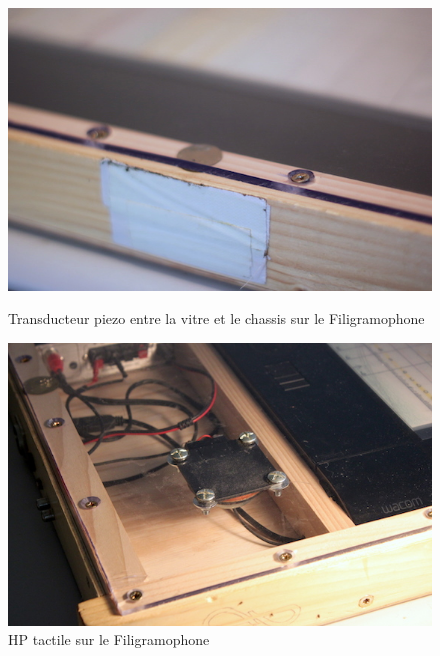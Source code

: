 \begin{figure}[!htbp]
	\captionsetup{format=plain}%
	\centering
	\begin{minipage}[t]{0.48\textwidth}
		\includegraphics[width=\linewidth]{gfx/05_interfaces/filigramophone-piezo_72dpi.jpg}
		\caption{Transducteur piezo entre la vitre et le chassis sur le Filigramophone}
		\label{fig:interface:filigramophone-piezo}
	\end{minipage}
	\hspace{.02\linewidth}
	\begin{minipage}[t]{0.48\textwidth}
		\includegraphics[width=\linewidth]{gfx/05_interfaces/filigramophone_hp_72dpi.jpg}
		\caption{HP tactile sur le Filigramophone}
		\label{fig:interface:filigramophone-hp}
	\end{minipage}
\end{figure}
